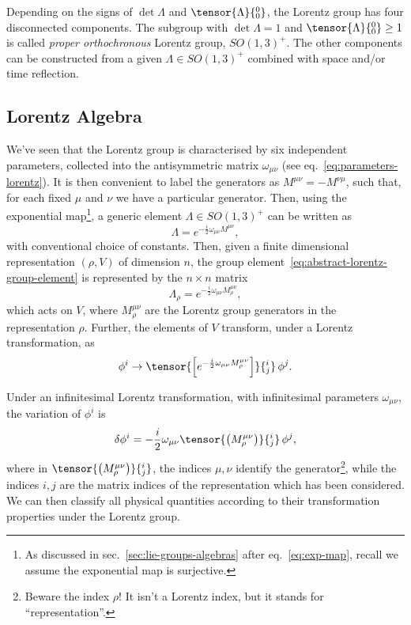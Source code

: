 Depending on the signs of $\det \Lambda$ and $\tensor{\Lambda}{^0_0}$, the Lorentz group has four disconnected components. The subgroup with $\det \Lambda = 1$ and $\tensor{\Lambda}{^0_0} \geq 1$ is called \emph{proper orthochronous} Lorentz group, $SO(1,3)^+$. The other components can be constructed from a given $\Lambda \in SO(1,3)^+$ combined with space and/or time reflection.


\subsection{Lorentz Algebra}
We've seen that the Lorentz group is characterised by six independent parameters, collected into the antisymmetric matrix $\omega_{\mu\nu}$ (see eq.~\eqref{eq:parameters-lorentz}). It is then convenient to label the generators as $M^{\mu\nu} = -M^{\nu\mu}$, such that, for each fixed $\mu$ and $\nu$ we have a particular generator. Then, using the exponential map\footnote{As discussed in sec.~\ref{sec:lie-groups-algebras} after eq.~\eqref{eq:exp-map}, recall we assume the exponential map is surjective.}, a generic element $\Lambda \in SO(1,3)^+$ can be written as
\begin{equation}\label{eq:abstract-lorentz-group-element}
   \Lambda = e^{-\frac{i}{2} \omega_{\mu\nu} M^{\mu\nu}},
\end{equation}
with conventional choice of constants. Then, given a finite dimensional representation $(\rho, V)$ of dimension $n$, the group element~\eqref{eq:abstract-lorentz-group-element} is represented by the $n \times n$ matrix
\begin{equation}
    \Lambda_\rho = e^{-\frac{i}{2} \omega_{\mu\nu} M^{\mu\nu}_\rho},
\end{equation}
which acts on $V$, where $M^{\mu\nu}_\rho$ are the Lorentz group generators in the representation $\rho$. Further, the elements of $V$ transform, under a Lorentz transformation, as
\begin{equation}
    \phi^i \to \tensor{\left[ e^{-\frac{i}{2} \omega_{\mu\nu} M^{\mu\nu}_\rho} \right]}{^i_j}  \, \phi^j .
\end{equation}

Under an infinitesimal Lorentz transformation, with infinitesimal parameters $\omega_{\mu\nu}$, the variation of $\phi^i$ is
\begin{equation}\label{eq:action-lorentz-transf}
    \delta \phi^i = -\frac{i}{2} \omega_{\mu\nu} \tensor{\left(  M^{\mu\nu}_\rho \right)}{^i_j} \, \phi^j, 
\end{equation}
where in $\tensor{\left(  M^{\mu\nu}_\rho \right)}{^i_j}$, the indices $\mu,\nu$ identify the generator\footnote{Beware the index $\rho$! It isn't a Lorentz index, but it stands for “representation”.}, while the indices $i,j$ are the matrix indices of the representation which has been considered. We can then classify all physical quantities according to their transformation properties under the Lorentz group.

